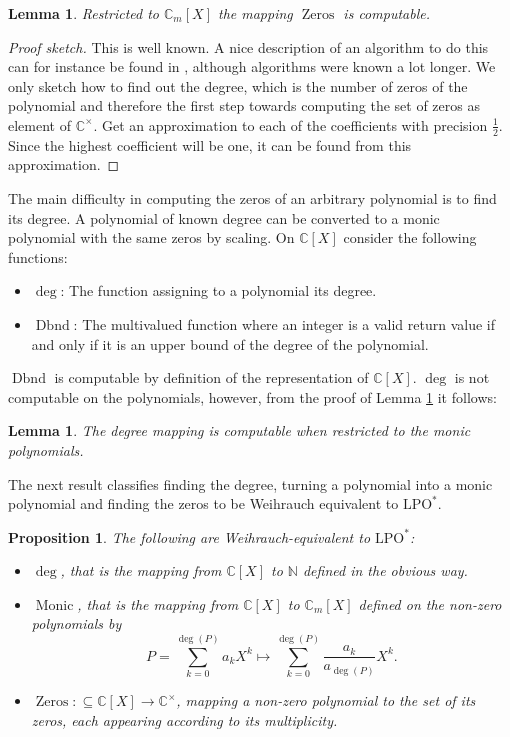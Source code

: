 \documentclass{eptcs-modified}
\newtheorem{proposition}[theorem]{Proposition}
\newtheorem{lemma}[theorem]{Lemma}
\newcommand{\lpo}{\textrm{LPO}}
\newcommand{\NN}{\mathbb{N}}
\newcommand{\CC}{\mathbb{C}}
\newcommand{\Monic}{\operatorname{Monic}}
\newcommand{\Zeros}{\operatorname{Zeros}}
\newcommand{\dbnd}{\operatorname{Dbnd}}
\begin{document}
			\begin{lemma}\label{resu:computable operations on the polynomials}
				Restricted to $\CC_m[X]$ the mapping $\Zeros$ is computable.
			\end{lemma}

			\begin{proof}[Proof sketch]
				This is well known.
				A nice description of an algorithm to do this can for instance be found in \cite{MR1905263}, although algorithms were known a lot longer.
				We only sketch how to find out the degree, which is the number of zeros of the polynomial and therefore the first step towards computing the set of zeros as element of $\CC^\times$.
				Get an approximation to each of the coefficients with precision $\frac 12$.
				Since the highest coefficient will be one, it can be found from this approximation.
			\end{proof}

			The main difficulty in computing the zeros of an arbitrary polynomial is to find its degree.
			A polynomial of known degree can be converted to a monic polynomial with the same zeros by scaling.
			On $\CC[X]$ consider the following functions:
			\begin{itemize}
				\item $\deg$: The function assigning to a polynomial its degree.
				\item $\dbnd$: The multivalued function where an integer is a valid return value if and only if it is an upper bound of the degree of the polynomial.
			\end{itemize}
			$\dbnd$ is computable by definition of the representation of $\CC[X]$.
			$\deg$ is not computable on the polynomials, however, from the proof of Lemma \ref{resu:computable operations on the polynomials} it follows:
			\begin{lemma}\label{resu:deg on the monics}
				The degree mapping is computable when restricted to the monic polynomials.
			\end{lemma}
			The next result classifies finding the degree, turning a polynomial into a monic polynomial and finding the zeros to be Weihrauch equivalent to $\lpo^*$.

			\begin{proposition}
				The following are Weihrauch-equivalent to $\lpo^*$:
				\begin{itemize}
					\item $\deg$, that is the mapping from $\CC[X]$ to $\NN$ defined in the obvious way.
					\item $\Monic$, that is the mapping from $\CC[X]$ to $\CC_m[X]$ defined on the non-zero polynomials by
					\[ P = \sum_{k=0}^{\deg(P)} a_k X^k \mapsto \sum_{k=0}^{\deg(P)}\frac{a_k}{a_{\deg(P)}}X^k. \]
					\item $\Zeros : \subseteq \CC[X] \to \mathbb{C}^\times$, mapping a non-zero polynomial to the set of its zeros, each appearing according to its multiplicity.
				\end{itemize}
			\end{proposition}
\end{document}
